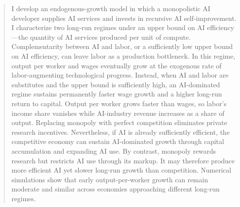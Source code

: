 \documentclass[11pt]{article}
\theoremstyle{remark}
\begin{document}

\begin{abstract}
I develop an endogenous-growth model in which a monopolistic AI developer
supplies AI services and invests in recursive AI self-improvement.
I characterize two long-run regimes under an upper bound on AI
efficiency---the quantity of AI services produced per unit of compute.
Complementarity between AI and labor, or a sufficiently low upper bound on
AI efficiency, can leave labor as a production bottleneck. In this regime,
output per worker and wages eventually grow
at the exogenous rate of labor-augmenting technological progress.
Instead, when AI and labor are substitutes and the upper bound is sufficiently high,
an AI-dominated regime sustains permanently faster wage growth and a higher
long-run return to capital. Output per worker grows faster than wages, so
labor's income share vanishes while AI-industry revenue increases as a share
of output. Replacing monopoly with perfect competition eliminates private
research incentives. Nevertheless, if AI is already sufficiently efficient,
the competitive economy can sustain AI-dominated growth through capital
accumulation and expanding AI use.
By contrast, monopoly rewards research but restricts AI use through its markup.
It may therefore produce more efficient AI yet slower long-run growth than
competition.
Numerical simulations show that early output-per-worker growth can remain
moderate and similar across economies approaching different long-run regimes.
\end{abstract}
\end{document}
